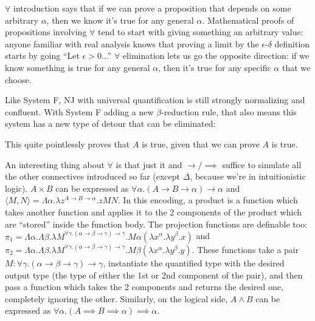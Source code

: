 \documentclass[12pt]{article}
\begin{document}
\begin{prooftree}
\end{prooftree}

\begin{prooftree}
\end{prooftree}

$\forall$ introduction says that if we can prove a proposition that depends on some arbitrary $\alpha$, then we know it's true for any general $\alpha$. Mathematical proofs of propositions involving $\forall$ tend to start with giving something an arbitrary value: anyone familiar with real analysis knows that proving a limit by the $\epsilon$-$\delta$ definition starts by going ``Let $\epsilon > 0$...'' $\forall$ elimination lets us go the opposite direction: if we know something is true for any general $\alpha$, then it's true for any specific $\alpha$ that we choose.

Like System F, NJ with universal quantification is still strongly normalizing and confluent. With System F adding a new $\beta$-reduction rule, that also means this system has a new type of detour that can be eliminated:

\begin{prooftree}
\end{prooftree}

This quite pointlessly proves that $A$ is true, given that we can prove $A$ is true.

An interesting thing about $\forall$ is that just it and $\to$/$\implies$ suffice to simulate all the other connectives introduced so far (except $\Delta$, because we're in intuitionistic logic). $A \times B$ can be expressed as $\forall \alpha. (A \to B \to \alpha) \to \alpha$ and $\langle M, N \rangle = \Lambda \alpha. \lambda z^{A \to B \to \alpha}.z M N$. In this encoding, a product is a function which takes another function and applies it to the 2 components of the product which are ``stored'' inside the function body. The projection functions are definable too: $\pi_1 = \Lambda \alpha. \Lambda \beta. \lambda M^{\forall \gamma. (\alpha \to \beta \to \gamma) \to \gamma}.M \alpha (\lambda x^\alpha. \lambda y^\beta. x)$ and $\pi_2 = \Lambda \alpha. \Lambda \beta. \lambda M^{\forall \gamma. (\alpha \to \beta \to \gamma) \to \gamma}.M \beta (\lambda x^\alpha. \lambda y^\beta. y)$. These functions take a pair $M: \forall \gamma. (\alpha \to \beta \to \gamma) \to \gamma$, instantiate the quantified type with the desired output type (the type of either the 1st or 2nd component of the pair), and then pass a function which takes the 2 components and returns the desired one, completely ignoring the other. Similarly, on the logical side, $A \land B$ can be expressed as $\forall \alpha. (A \implies B \implies \alpha) \implies \alpha$.
\end{document}
